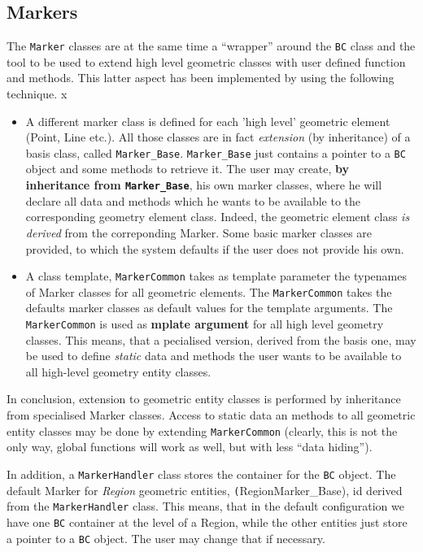 \subsection{Markers}
The \texttt{Marker} classes are at the same time a ``wrapper'' around
the \texttt{BC} class and the tool to be used to extend high level
geometric classes with user defined function and methods. This latter
aspect has been implemented by using the following technique.
x\begin{itemize}
\item A different marker class is defined for each 'high level'
  geometric element (Point, Line etc.). All those classes are in fact
  \emph{extension} (by inheritance) of a basis class, called
  \texttt{Marker\_Base}. \texttt{Marker\_Base} just contains a pointer
  to a \texttt{BC} object and some methods to retrieve it. The user
  may create, \textbf{by inheritance from \texttt{Marker\_Base}}, his
  own marker classes, where he will declare all data and methods which
  he wants to be available to the corresponding geometry element
  class. Indeed, the geometric element class \emph{is derived} from
  the correponding Marker.  Some basic marker classes are provided, to
  which the system defaults if the user does not provide his own.
\item A class template, \texttt{MarkerCommon} takes as template
  parameter the typenames of Marker classes for all geometric
  elements.  The \texttt{MarkerCommon} takes the defaults marker
  classes as default values for the template arguments. The
  \texttt{MarkerCommon} is used as \textbf{mplate argument} for all
  high level geometry classes.  This means, that a pecialised version,
  derived from the basis one, may be used to define \textit{static} data and methods
  the user wants to be available to all high-level geometry entity classes.
\end{itemize}
In conclusion, extension to geometric entity classes is performed by
inheritance from specialised Marker classes. Access to static data an
methods to all geometric entity classes may be done by extending
\texttt{MarkerCommon} (clearly, this is not the only way, global
functions will work as well, but with less ``data hiding'').

In addition, a \texttt{MarkerHandler} class stores the container for
the \texttt{BC} object. The default Marker for \emph{Region} geometric
entities, \texttt(RegionMarker\_Base), id derived from the
\texttt{MarkerHandler} class. This means, that in the default
configuration we have one \texttt{BC} container at the level of a
Region, while the other entities just store a pointer to a \texttt{BC} 
object. The user may change that if necessary.


